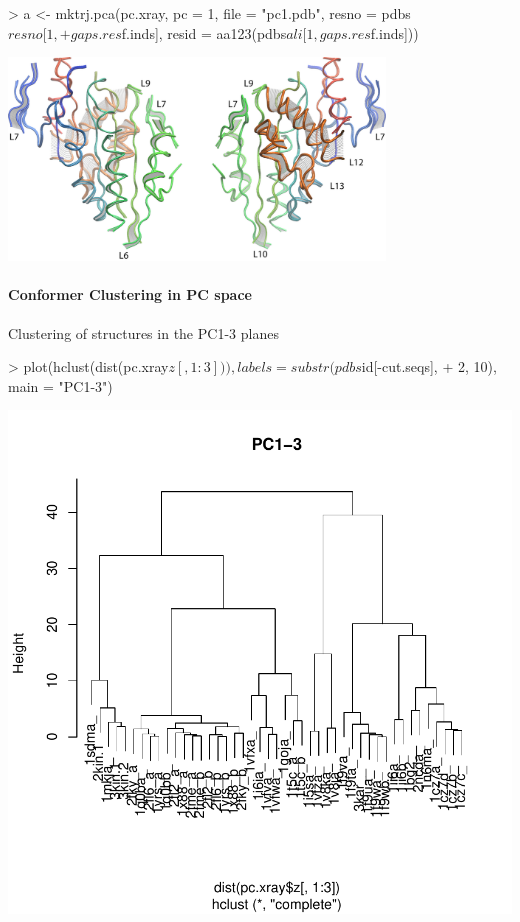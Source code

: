 \documentclass[a4paper]{article}
\begin{document}
\begin{Schunk}
\begin{Sinput}
> a <- mktrj.pca(pc.xray, pc = 1, file = "pc1.pdb", resno = pdbs$resno[1, 
+     gaps.res$f.inds], resid = aa123(pdbs$ali[1, gaps.res$f.inds]))
\end{Sinput}
\end{Schunk}

\begin{center}
\includegraphics[width=100mm]{figs/pca.png}
\end{center}

\paragraph{Conformer Clustering in PC space}
Clustering of structures in the PC1-3 planes

\begin{center}
\begin{Schunk}
\begin{Sinput}
> plot(hclust(dist(pc.xray$z[, 1:3])), labels = substr(pdbs$id[-cut.seqs], 
+     2, 10), main = "PC1-3")
\end{Sinput}
\end{Schunk}
\includegraphics{figs/fig-019}
\end{center}
\end{document}
